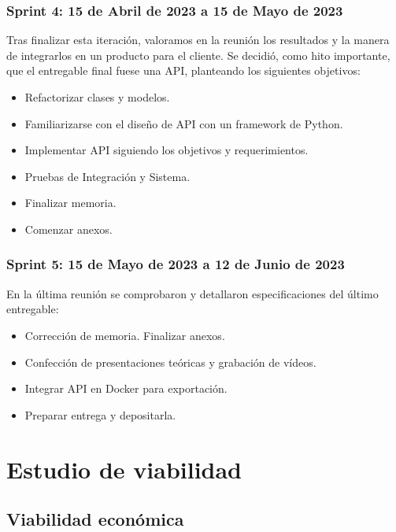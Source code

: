 \subsubsection{Sprint 4: 15 de Abril de 2023 a 15 de Mayo de 2023}

Tras finalizar esta iteración, valoramos en la reunión los resultados y la manera de integrarlos en un producto para el cliente.
Se decidió, como hito importante, que el entregable final fuese una API, planteando los siguientes objetivos:

\begin{itemize}
    \item Refactorizar clases y modelos.
    \item Familiarizarse con el diseño de API con un framework de Python.
    \item Implementar API siguiendo los objetivos y requerimientos.
    \item Pruebas de Integración y Sistema.
    \item Finalizar memoria. 
    \item Comenzar anexos.
\end{itemize}

\subsubsection{Sprint 5: 15 de Mayo de 2023 a 12 de Junio de 2023}

En la última reunión se comprobaron y detallaron especificaciones del último entregable:

\begin{itemize}
    \item Corrección de memoria. Finalizar anexos.
    \item Confección de presentaciones teóricas y grabación de vídeos.
    \item Integrar API en Docker para exportación.
    \item Preparar entrega y depositarla.
\end{itemize}

\newpage

\section{Estudio de viabilidad}

\subsection{Viabilidad económica}

